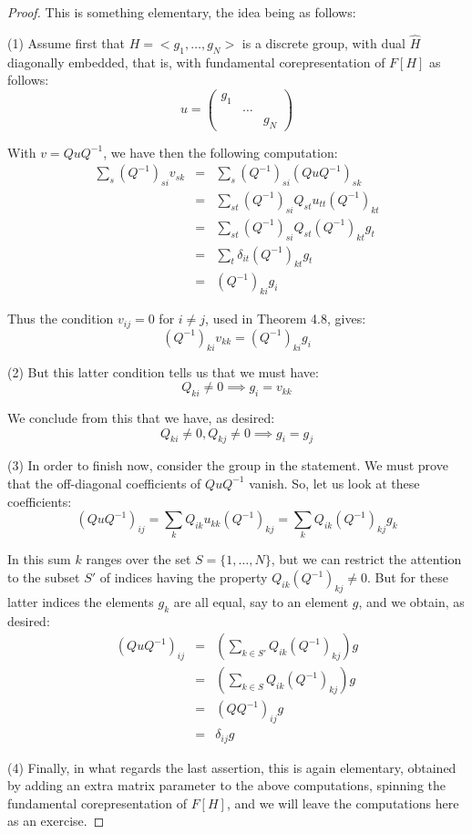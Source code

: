 \documentclass[12pt]{amsbook}
\begin{document}
\begin{proof}
This is something elementary, the idea being as follows:

\medskip

(1) Assume first that $H=<g_1,\ldots,g_N>$ is a discrete group, with dual $\widehat{H}$ diagonally embedded, that is, with fundamental corepresentation of $F[H]$ as follows:
$$u=\begin{pmatrix}
g_1\\
&\ldots\\
&&g_N
\end{pmatrix}$$

With $v=QuQ^{-1}$, we have then the following computation:
\begin{eqnarray*}
\sum_s(Q^{-1})_{si}v_{sk}
&=&\sum_s(Q^{-1})_{si}(QuQ^{-1})_{sk}\\
&=&\sum_{st}(Q^{-1})_{si}Q_{st}u_{tt}(Q^{-1})_{kt}\\
&=&\sum_{st}(Q^{-1})_{si}Q_{st}(Q^{-1})_{kt}g_t\\
&=&\sum_t\delta_{it}(Q^{-1})_{kt}g_t\\
&=&(Q^{-1})_{ki}g_i
\end{eqnarray*}

Thus the condition $v_{ij}=0$ for $i\neq j$, used in Theorem 4.8, gives:
$$(Q^{-1})_{ki}v_{kk}=(Q^{-1})_{ki}g_i$$

(2) But this latter condition tells us that we must have:
$$Q_{ki}\neq0\implies g_i=v_{kk}$$

We conclude from this that we have, as desired:
$$Q_{ki}\neq0,Q_{kj}\neq0\implies g_i=g_j$$

(3) In order to finish now, consider the group in the statement. We must prove that the off-diagonal coefficients of $QuQ^{-1}$ vanish. So, let us look at these coefficients:
$$(QuQ^{-1})_{ij}=\sum_kQ_{ik}u_{kk}(Q^{-1})_{kj}=\sum_kQ_{ik}(Q^{-1})_{kj}g_k$$

In this sum $k$ ranges over the set $S=\{1,\ldots,N\}$, but we can restrict the attention to the subset $S'$ of indices having the property $Q_{ik}(Q^{-1})_{kj}\neq 0$.  But for these latter indices the elements $g_k$ are all equal, say to an element $g$, and we obtain, as desired:
\begin{eqnarray*}
(QuQ^{-1})_{ij}
&=&\left(\sum_{k\in S'}Q_{ik}(Q^{-1})_{kj}\right)g\\
&=&\left(\sum_{k\in S}Q_{ik}(Q^{-1})_{kj}\right)g\\
&=&(QQ^{-1})_{ij}g\\
&=&\delta_{ij}g
\end{eqnarray*}

(4) Finally, in what regards the last assertion, this is again elementary, obtained by adding an extra matrix parameter to the above computations, spinning the fundamental corepresentation of $F[H]$, and we will leave the computations here as an exercise.
\end{proof}
\end{document}
